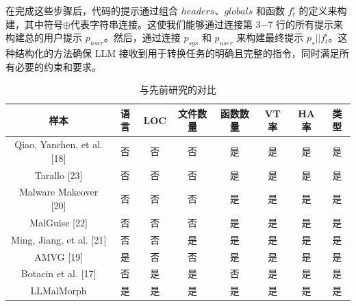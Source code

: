 在完成这些步骤后，代码的提示通过组合 $headers$、$globals$ 和函数 $f_{t}^{i}$ 的定义来构建，其中符号$\oplus$代表字符串连接。这使我们能够通过连接第 3−7 行的所有提示来构建总的用户提示 $p_{user}$。然后，通过连接 $p_{sys}$ 和 $p_{user}$ 来构建最终提示 $p_{s}||f_{t}^{i}$。这种结构化的方法确保 LLM 接收到用于转换任务的明确且完整的指令，同时满足所有必要的约束和要求。

\begin{table}[htbp]
	\centering
	\caption{与先前研究的对比}
	\label{tab:4.1}
	\begin{tabular*}{\textwidth}{@{\extracolsep{\fill}}cccccccc}
		\toprule
		样本 & 语言 & LOC & 文件数量 & 函数数量 & VT率 & HA率 & 类型 \\
		\midrule
		{Qiao, Yanchen, et al. [18]} & 否 & 否 & 否 & 是 & 是 & 是 & 是 \\
		{Tarallo [23]} & 否 & 否 & 否 & 是 & 是 & 是 & 是 \\
		{Malware Makeover [20]} & 否 & 否 & 否 & 是 & 是 & 是 & 是 \\
		{MalGuise [22]} & 否 & 否 & 否 & 是 & 是 & 是 & 是 \\
		{Ming, Jiang, et al. [21]} & 否 & 否 & 是 & 是 & 是 & 是 & 是 \\
		AMVG [19] & 是 & 否 & 否 & 是 & 是 & 是 & 是 \\
        Botacin et al. [17] & 否 & 是 & 是 & 否 & 是 & 是 & 是 \\
        LLMalMorph & 是 & 是 & 是 & 是 & 是 & 是 & 是 \\
		\bottomrule
	\end{tabular*}
\end{table}